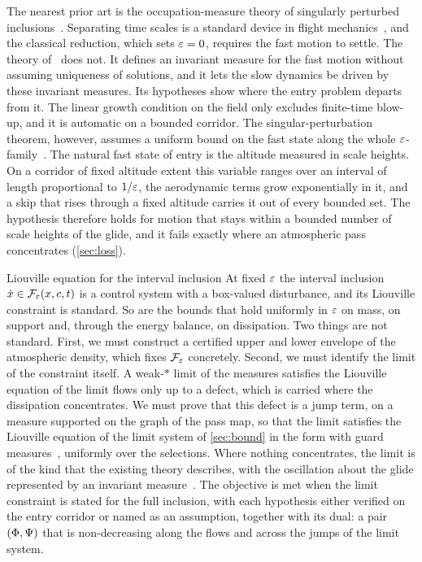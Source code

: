 \documentclass[english,11pt]{extarticle}
\begin{document}
The nearest prior art is the occupation-measure theory of singularly
perturbed inclusions~\cite{artstein1999invariant}. Separating time scales is
a standard device in flight mechanics~\cite{naidu2001singular}, and the
classical reduction, which sets $\varepsilon=0$, requires the fast motion to
settle. The theory of~\cite{artstein1999invariant} does not. It defines an
invariant measure for the fast motion without assuming uniqueness of
solutions, and it lets the slow dynamics be driven by these invariant
measures. Its hypotheses show where the entry problem departs from it. The
linear growth condition on the field only excludes finite-time blow-up, and
it is automatic on a bounded corridor. The singular-perturbation theorem,
however, assumes a uniform bound on the fast state along the whole
$\varepsilon$-family~\cite{artstein1999invariant,artstein2000value}. The natural
fast state of entry is the altitude measured in scale heights. On a corridor
of fixed altitude extent this variable ranges over an interval of length
proportional to $1/\varepsilon$, the aerodynamic terms grow exponentially in it,
and a skip that rises through a fixed altitude carries it out of every
bounded set. The hypothesis therefore holds for motion that stays within a
bounded number of scale heights of the glide, and it fails exactly where an
atmospheric pass concentrates (\cref{sec:loss}).

\begin{openitem}{Liouville equation for the interval inclusion}
\label{obj:embedding}
At fixed $\varepsilon$ the interval inclusion $\dot x\in\mathcal{F}_\varepsilon(x,c,t)$ is a
control system with a box-valued disturbance, and its Liouville constraint
is standard. So are the bounds that hold uniformly in $\varepsilon$ on mass, on
support and, through the energy balance, on dissipation. Two things are not
standard. First, we must construct a certified upper and lower envelope of
the atmospheric density, which fixes $\mathcal{F}_\varepsilon$ concretely. Second, we
must identify the limit of the constraint itself. A weak-$*$ limit of the
measures satisfies the Liouville equation of the limit flows only up to a
defect, which is carried where the dissipation concentrates. We must prove
that this defect is a jump term, on a measure supported on the graph of the
pass map, so that the limit satisfies the Liouville equation of the limit
system of \cref{sec:bound} in the form with guard
measures~\cite{shia2014convex,zhao2020optimal}, uniformly over the
selections. Where nothing concentrates, the limit is of the kind that the
existing theory describes, with the oscillation about the glide represented
by an invariant measure~\cite{artstein1999invariant}. The objective is met
when the limit constraint is stated for the full inclusion, with each
hypothesis either verified on the entry corridor or named as an assumption,
together with its dual: a pair $(\Phi,\Psi)$ that is non-decreasing along
the flows and across the jumps of the limit system.
\end{openitem}
\end{document}
